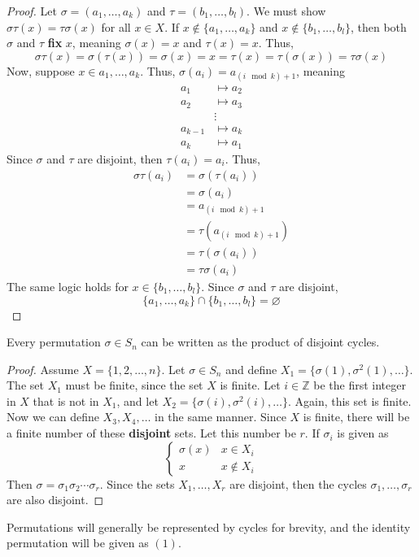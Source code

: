 \documentclass[12pt, letterpaper]{report}
\begin{document}
\begin{proof}
	Let \(\sigma =(a_1,\ldots,a_k)\) and \(\tau =(b_1,\ldots,b_l)\). We must show \(\sigma \tau (x)=\tau \sigma (x)\) for all \(x\in X\). If \(x\notin \{ a_1,\ldots,a_k \} \) and \(x \notin \{ b_1,\ldots,b_l \} \), then both \(\sigma \) and \(\tau \) \textbf{fix} \(x\), meaning \(\sigma (x)=x\) and \(\tau (x)=x\). Thus,
	\[
		\sigma \tau (x)=\sigma (\tau (x))=\sigma (x)=x=\tau (x)=\tau (\sigma (x))=\tau \sigma (x)
	\]
	Now, suppose \(x\in {a_1,\ldots,a_k}\). Thus, \(\sigma (a_i)=a_{(i\mod k)+1} \), meaning 
	\begin{align*}
		a_1&\mapsto a_2\\
		a_2&\mapsto a_3\\
		&\vdots\\
		a_{k-1}&\mapsto a_k\\
		a_k&\mapsto a_1 
	\end{align*}
	Since \(\sigma \) and \(\tau \) are disjoint, then \(\tau (a_i)=a_i\). Thus, 
	\begin{align*}
		\sigma \tau (a_i)&=\sigma (\tau (a_i))\\
		&=\sigma (a_i)\\
		&=a_{(i\mod k)+1}\\
		&=\tau (a_{(i\mod k)+1})\\
		&=\tau (\sigma (a_{i} ))\\
		&=\tau \sigma (a_i)
	\end{align*}
	The same logic holds for \(x\in\{ b_1,\ldots,b_l  \} \). Since \(\sigma \) and \(\tau \) are disjoint,
	\[
		\{ a_1,\ldots,a_k \} \cap \{ b_1,\ldots,b_l \} =\varnothing 
	\]
\end{proof}
\begin{theorem}
	Every permutation \(\sigma \in S_n\) can be written as the product of disjoint cycles.
\end{theorem}
\begin{proof}
	Assume \(X=\{1,2,\ldots,n\}\). Let \(\sigma \in S_n\) and define \(X_1=\{ \sigma (1),\sigma^2 (1),\ldots \} \). The set \(X_1\) must be finite, since the set \(X\) is finite. Let \(i\in\mathbb{Z} \) be the first integer in \(X\) that is not in \(X_1\), and let \(X_2=\{ \sigma (i),\sigma ^2(i),\ldots \} \). Again, this set is finite. Now we can define \(X_3,X_4,\ldots\) in the same manner. Since \(X\) is finite, there will be a finite number of these \textbf{disjoint} sets. Let this number be \(r\). If \(\sigma _i\) is given as 
	\[
		\left\{\begin{array}{cc}
			\sigma (x)&x\in X_i\\
			x&x\notin X_i
		\end{array}\right.
	\]
	Then \(\sigma =\sigma _1 \sigma _2 \cdots \sigma _r\). Since the sets \(X_1,\ldots, X_r\) are disjoint, then the cycles \(\sigma _1,\ldots,\sigma _r\) are also disjoint.
\end{proof}
\begin{remark}
	Permutations will generally be represented by cycles for brevity, and the identity permutation will be given as \((1)\).
\end{remark}
\end{document}
